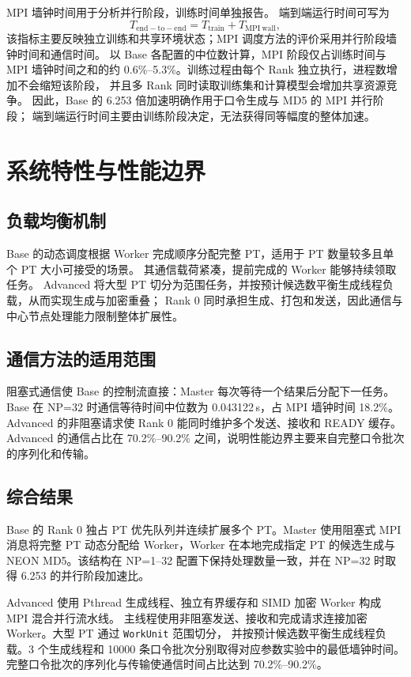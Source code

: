 \documentclass[UTF8,a4paper,12pt]{ctexart}
\newcommand{\code}[1]{\texttt{#1}}
\newcommand{\seconds}[1]{#1\,s}
\begin{document}
MPI 墙钟时间用于分析并行阶段，训练时间单独报告。
端到端运行时间可写为
\[
T_{\mathrm{end-to-end}} = T_{\mathrm{train}} + T_{\mathrm{MPI\ wall}},
\]
该指标主要反映独立训练和共享环境状态；MPI 调度方法的评价采用并行阶段墙钟时间和通信时间。
以 Base 各配置的中位数计算，MPI 阶段仅占训练时间与 MPI 墙钟时间之和的约
0.6\%--5.3\%。训练过程由每个 Rank 独立执行，进程数增加不会缩短该阶段，
并且多 Rank 同时读取训练集和计算模型会增加共享资源竞争。
因此，Base 的 6.253 倍加速明确作用于口令生成与 MD5 的 MPI 并行阶段；
端到端运行时间主要由训练阶段决定，无法获得同等幅度的整体加速。

\section{系统特性与性能边界}

\subsection{负载均衡机制}

Base 的动态调度根据 Worker 完成顺序分配完整 PT，适用于 PT 数量较多且单个 PT 大小可接受的场景。
其通信载荷紧凑，提前完成的 Worker 能够持续领取任务。
Advanced 将大型 PT 切分为范围任务，并按预计候选数平衡生成线程负载，从而实现生成与加密重叠；
Rank 0 同时承担生成、打包和发送，因此通信与中心节点处理能力限制整体扩展性。

\subsection{通信方法的适用范围}

阻塞式通信使 Base 的控制流直接：Master 每次等待一个结果后分配下一任务。
Base 在 NP=32 时通信等待时间中位数为 \seconds{0.043122}，占 MPI 墙钟时间 18.2\%。
Advanced 的非阻塞请求使 Rank 0 能同时维护多个发送、接收和 READY 缓存。
Advanced 的通信占比在 70.2\%--90.2\% 之间，说明性能边界主要来自完整口令批次的序列化和传输。



\subsection{综合结果}

Base 的 Rank 0 独占 PT 优先队列并连续扩展多个 PT。Master 使用阻塞式 MPI 消息将完整 PT
动态分配给 Worker，Worker 在本地完成指定 PT 的候选生成与 NEON MD5。该结构在 NP=1--32
配置下保持处理数量一致，并在 NP=32 时取得 6.253 的并行阶段加速比。

Advanced 使用 Pthread 生成线程、独立有界缓存和 SIMD 加密 Worker 构成 MPI 混合并行流水线。
主线程使用非阻塞发送、接收和完成请求连接加密 Worker。大型 PT 通过 \code{WorkUnit} 范围切分，
并按预计候选数平衡生成线程负载。3 个生成线程和 10000 条口令批次分别取得对应参数实验中的最低墙钟时间。
完整口令批次的序列化与传输使通信时间占比达到 70.2\%--90.2\%。
\end{document}
